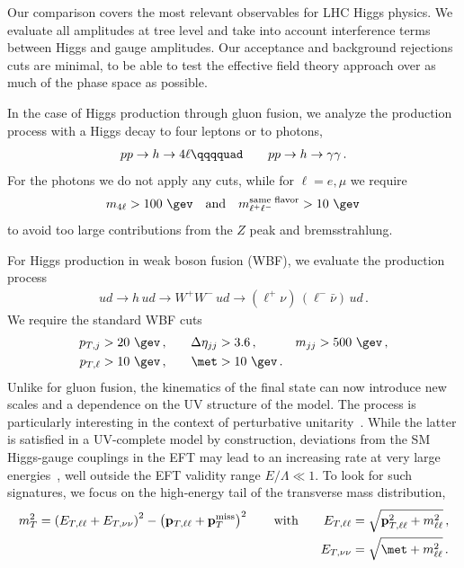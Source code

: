 Our comparison covers the most relevant observables for LHC Higgs
physics.  We evaluate all amplitudes at tree level and take into
account interference terms between Higgs and gauge amplitudes.  Our
acceptance and background rejections cuts are minimal, to be able to
test the effective field theory approach over as much of the phase
space as possible.\medskip

In the case of Higgs production through gluon fusion, we analyze the
production process with a Higgs decay to four leptons or to photons,
%
\begin{align} p p \to h \to 4 \ell \qqqquad \qquad p p \to h \to
\gamma \gamma \,.
  \label{eq:gg_4l_process}
\end{align}
%
For the photons we do not apply any cuts, while for $\ell = e, \mu$ we
require
%
\begin{align} m_{4 \ell} > 100 \ \gev \quad \text{and} \quad m_{\ell^+
\ell^-}^\text{same flavor} > 10 \ \gev \,
\end{align}
%
to avoid too large contributions from the $Z$ peak and
bremsstrahlung.\medskip

For Higgs production in weak boson fusion (WBF), we evaluate the
production process
%
\begin{align} u d \to h \, u d \to W^+ W^- \, ud \to (\ell^+ \nu) \,
(\ell^- \bar{\nu}) \, ud \,.
\label{eq:wbf_proc}
\end{align}
%
We require the standard WBF cuts
%
\begin{align} p_{T,j} &> 20 \ \gev \,, \quad & \Delta \eta_{jj} &> 3.6
\,, \quad & m_{jj} &> 500 \ \gev \,, \notag \\ p_{T,\ell} &> 10 \ \gev
\,, \quad & \met &> 10 \ \gev \,.
\label{eq:wbf_cuts}
\end{align}
%
Unlike for gluon fusion, the kinematics of the final state can now
introduce new scales and a dependence on the UV structure of the
model. The process is particularly interesting in the context of
perturbative unitarity~\cite{general-unitarity}. While the latter is
satisfied in a UV-complete model by construction, deviations from the
SM Higgs-gauge couplings in the EFT may lead to an increasing rate at
very large energies~\cite{Han:2009em,higgs_pole}, well outside the EFT
validity range $E / \Lambda \ll 1$.  To look for such signatures, we
focus on the high-energy tail of the transverse mass distribution,
%
\begin{align} m_T^2 = \left( E_{T,\ell \ell } + E_{T,\nu \nu }
\right)^2 - \left( \mathbf{p}_{T,\ell \ell } +
\mathbf{p}_T^{\text{miss}} \right)^2 \qquad \text{with} \qquad
E_{T,\ell \ell } &= \sqrt{\mathbf{p}_{T,\ell \ell }^2 + m_{\ell \ell
}^2} \,, \notag \\ E_{T,\nu \nu } &= \sqrt{\met + m_{\ell \ell }^2}
\,.
  \label{eq:mT}
\end{align} \medskip

